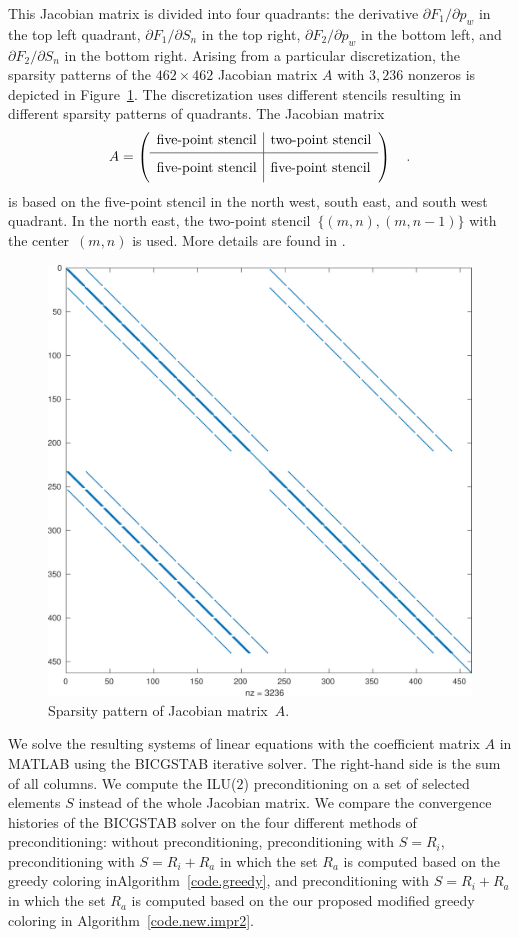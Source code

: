 \documentclass[12pt, twoside,a4paper,toc=bibliography]{scrbook}
\newcommand{\figref}[1]{Figure~\protect\ref{#1}}
\newcommand{\coderef}[1]{Algorithm~\protect\ref{#1}}
\begin{document}
This Jacobian matrix is divided into four quadrants: the derivative $\partial F_1 / \partial p_w$ in the top left quadrant, $\partial F_1 / \partial S_n$ in the top right, $\partial F_2 / \partial p_w$ in the bottom left, and $\partial F_2 / \partial S_n$ in the bottom right. Arising from a particular discretization,
the sparsity patterns of the $462 \times 462$ Jacobian matrix $A$
with $3,236$ nonzeros is depicted in \figref{f:geophysik_J_matrices}.
The discretization uses different stencils resulting in different sparsity patterns of quadrants.
The Jacobian matrix
$$
A =
\left({\begin{array}{l|l}
	\text{five-point stencil} & \text{two-point stencil} \\[0.25em]
	\hline
	\text{five-point stencil} \rule[-7.5pt]{0pt}{21pt} & \text{five-point stencil} \\
 \end{array}} \right)
\quad.
$$
is based on the five-point stencil
in the north west, south east, and south west quadrant.
In the north east, the two-point stencil~$\{(m,n), (m,n-1)\}$ with the center~$(m,n)$ is used.
More details are found in \cite{Lulfesmann2012Fap}.

\begin{figure}%
	\footnotesize
	\centering
         \includegraphics[width=0.6\linewidth]{co2_jac}
\caption{Sparsity pattern of Jacobian matrix~$A$.}%
\label{f:geophysik_J_matrices}
\end{figure}

We solve the resulting systems of linear equations with the
coefficient matrix $A$ in MATLAB using the BICGSTAB iterative solver.
The right-hand side is the sum of all columns.
We compute the ILU($2$) preconditioning on a set of selected elements $S$
instead of the whole Jacobian matrix.
We compare the convergence histories of the BICGSTAB solver
on the four different methods of preconditioning:
without preconditioning,
preconditioning with $S=R_i$,
preconditioning with $S=R_i + R_a$ in which
the set $R_a$ is computed based on the greedy coloring in\coderef{code.greedy},
and preconditioning with $S=R_i + R_a$ in which
the set $R_a$ is computed based on the our proposed modified greedy coloring in \coderef{code.new.impr2}.
\end{document}

